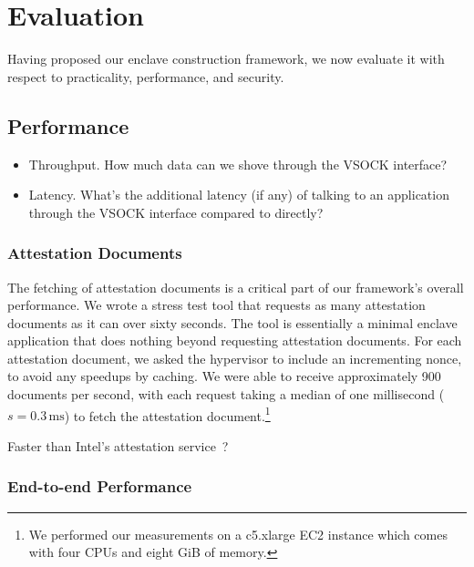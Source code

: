 \section{Evaluation}
\label{sec:evaluation}

Having proposed our enclave construction framework, we now evaluate it with respect to practicality, performance, and security.

\subsection{Performance}
\label{sec:performance}

\begin{itemize}
    \item Throughput. How much data can we shove through the VSOCK interface?
    \item Latency. What's the additional latency (if any) of talking to an application through the VSOCK interface compared to directly?
\end{itemize}

\subsubsection{Attestation Documents}
\label{sec:attestation-performance}

The fetching of attestation documents is a critical part of our framework's overall performance.  We wrote a stress test tool that requests as many attestation documents as it can over sixty seconds.  The tool is essentially a minimal enclave application that does nothing beyond requesting attestation documents.  For each attestation document, we asked the hypervisor to include an incrementing nonce, to avoid any speedups by caching.  We were able to receive approximately 900 documents per second, with each request taking a median of one millisecond ($s = 0.3\,\text{ms}$) to fetch the attestation document.\footnote{We performed our measurements on a c5.xlarge EC2 instance which comes with four CPUs and eight GiB of memory.}

Faster than Intel's attestation service~\cite{Chen2019a}?

\subsubsection{End-to-end Performance}
\label{sec:end-to-end}

